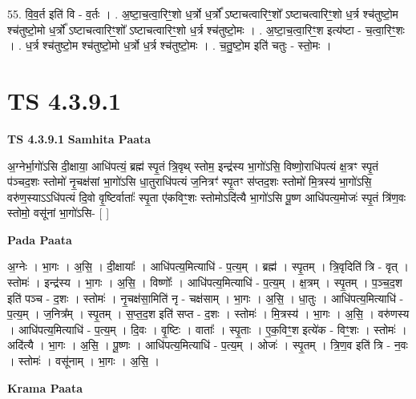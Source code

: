 \documentclass[17pt]{extarticle}
\begin{document}
55. वि॒व॒र्त इति॑ वि - व॒र्तः । . अ॒ष्टा॒च॒त्वा॒रिꣳ॒॒शो ध॒र्त्रो ध॒र्त्रो᳚ ऽष्टाचत्वारिꣳ॒॒शो᳚ ऽष्टाचत्वारिꣳ॒॒शो ध॒र्त्र श्च॑तुष्टो॒म श्च॑तुष्टो॒मो ध॒र्त्रो᳚ ऽष्टाचत्वारिꣳ॒॒शो᳚ ऽष्टाचत्वारिꣳ॒॒शो ध॒र्त्र श्च॑तुष्टो॒मः । . अ॒ष्टा॒च॒त्वा॒रिꣳ॒॒श इत्य॑ष्टा - च॒त्वा॒रिꣳ॒॒शः । . ध॒र्त्र श्च॑तुष्टो॒म श्च॑तुष्टो॒मो ध॒र्त्रो ध॒र्त्र श्च॑तुष्टो॒मः । . च॒तु॒ष्टो॒म इति॑ चतुः - स्तो॒मः । \newline
\pagebreak
{}

\section{ TS 4.3.9.1 }

\textbf{TS 4.3.9.1 } \newline
\textbf{Samhita Paata} \newline

अ॒ग्नेर्भा॒गो॑ऽसि दी॒क्षाया॒ आधि॑पत्यं॒ ब्रह्म॑ स्पृ॒तं त्रि॒वृथ् स्तोम॒ इन्द्र॑स्य भा॒गो॑ऽसि॒ विष्णो॒राधि॑पत्यं क्ष॒त्रꣳ स्पृ॒तं प॑ञ्चद॒शः स्तोमो॑ नृ॒चक्ष॑सां भा॒गो॑ऽसि धा॒तुराधि॑पत्यं ज॒नित्रꣳ॑ स्पृ॒तꣳ स॑प्तद॒शः स्तोमो॑ मि॒त्रस्य॑ भा॒गो॑ऽसि॒ वरु॑ण॒स्याऽऽधि॑पत्यं दि॒वो वृ॒ष्टिर्वाताः᳚ स्पृ॒ता ए॑कविꣳ॒॒शः स्तोमोऽदि॑त्यै भा॒गो॑ऽसि पू॒ष्ण आधि॑पत्य॒मोजः॑ स्पृ॒तं त्रि॑ण॒वः स्तोमो॒ वसू॑नां भा॒गो॑ऽसि- [  ] \newline

\textbf{Pada Paata} \newline

अ॒ग्नेः । भा॒गः । अ॒सि॒ । दी॒क्षायाः᳚ । आधि॑पत्य॒मित्याधि॑ - प॒त्य॒म् । ब्रह्म॑ । स्पृ॒तम् । त्रि॒वृदिति॑ त्रि - वृत् । स्तोमः॑ । इन्द्र॑स्य । भा॒गः । अ॒सि॒ । विष्णोः᳚ । आधि॑पत्य॒मित्याधि॑ - प॒त्य॒म् । क्ष॒त्रम् । स्पृ॒तम् । प॒ञ्च॒द॒श इति॑ पञ्च - द॒शः । स्तोमः॑ । नृ॒चक्ष॑सा॒मिति॑ नृ - चक्ष॑साम् । भा॒गः । अ॒सि॒ । धा॒तुः । आधि॑पत्य॒मित्याधि॑ - प॒त्य॒म् । ज॒नित्र᳚म् । स्पृ॒तम् । स॒प्त॒द॒श इति॑ सप्त - द॒शः । स्तोमः॑ । मि॒त्रस्य॑ । भा॒गः । अ॒सि॒ । वरु॑णस्य । आधि॑पत्य॒मित्याधि॑ - प॒त्य॒म् । दि॒वः । वृ॒ष्टिः । वाताः᳚ । स्पृ॒ताः । ए॒क॒विꣳ॒॒श इत्ये॑क - विꣳ॒॒शः । स्तोमः॑ । अदि॑त्यै । भा॒गः । अ॒सि॒ । पू॒ष्णः । आधि॑पत्य॒मित्याधि॑ - प॒त्य॒म् । ओजः॑ । स्पृ॒तम् । त्रि॒ण॒व इति॑ त्रि - न॒वः । स्तोमः॑ । वसू॑नाम् । भा॒गः । अ॒सि॒ ।  \newline


\textbf{Krama Paata} \newline
\end{document}

